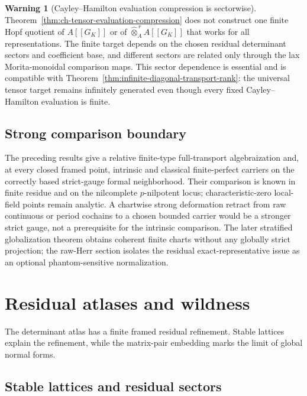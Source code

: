 \documentclass[11pt]{article}
\theoremstyle{definition}
\newtheorem{warning}[theorem]{Warning}
\begin{document}
\begin{warning}[Cayley--Hamilton evaluation compression is sectorwise]\label{warn:ch-evaluation-sectorwise}
Theorem~\ref{thm:ch-tensor-evaluation-compression} does not construct one
finite Hopf quotient of $A[[G_K]]$ or of
$\widehat\otimes_A^{\,r}A[[G_K]]$ that works for all representations.  The
finite target depends on the chosen residual determinant sectors and
coefficient base, and different sectors are related only through the lax
Morita-monoidal comparison maps.  This sector dependence is essential and is
compatible with Theorem~\ref{thm:infinite-diagonal-transport-rank}: the
universal tensor target remains infinitely generated even though every fixed
Cayley--Hamilton evaluation is finite.
\end{warning}

\subsection{Strong comparison boundary}

The preceding results give a relative finite-type full-transport algebraization and, at every closed framed point, intrinsic and classical finite-perfect carriers on the correctly based strict-gauge formal neighborhood.  Their comparison is known in finite residue and on the nilcomplete $p$-nilpotent locus; characteristic-zero local-field points remain analytic.  A chartwise strong deformation retract from raw continuous or period cochains to a chosen bounded carrier would be a stronger strict gauge, not a prerequisite for the intrinsic comparison.  The later stratified globalization theorem obtains coherent finite charts without any globally strict projection; the raw-Herr section isolates the residual exact-representative issue as an optional phantom-sensitive normalization.


\section{Residual atlases and wildness}\label{sec:residual-atlas}

The determinant atlas has a finite framed residual refinement.  Stable lattices explain the refinement, while the matrix-pair embedding marks the limit of global normal forms.

\subsection{Stable lattices and residual sectors}
\end{document}
